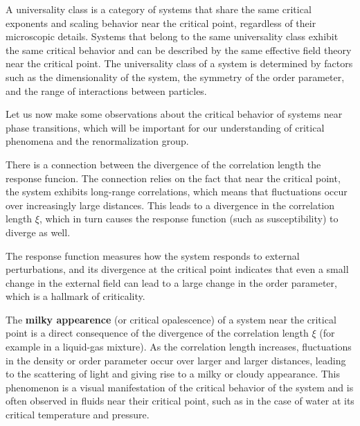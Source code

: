 \begin{definition}
    A universality class is a category of systems that share the same critical exponents and scaling behavior near the critical point, regardless of their microscopic details. Systems that belong to the same universality class exhibit the same critical behavior and can be described by the same effective field theory near the critical point. The universality class of a system is determined by factors such as the dimensionality of the system, the symmetry of the order parameter, and the range of interactions between particles.
\end{definition}

Let us now make some observations about the critical behavior of systems near phase transitions, which will be important for our understanding of critical phenomena and the renormalization group.

\begin{remark}
    There is a connection between the divergence of the correlation length the response funcion. 
    The connection relies on the fact that near the critical point, the system exhibits long-range correlations, which means that fluctuations occur over increasingly large distances. This leads to a divergence in the correlation length \(\xi\), which in turn causes the response function (such as susceptibility) to diverge as well.

    The response function measures how the system responds to external perturbations, and its divergence at the critical point indicates that even a small change in the external field can lead to a large change in the order parameter, which is a hallmark of criticality.
\end{remark}

\begin{remark}
    The \textbf{milky appearence} (or critical opalescence) of a system near the critical point is a direct consequence of the divergence of the correlation length \(\xi\) (for example in a liquid-gas mixture). As the correlation length increases, fluctuations in the density or order parameter occur over larger and larger distances, leading to the scattering of light and giving rise to a milky or cloudy appearance. This phenomenon is a visual manifestation of the critical behavior of the system and is often observed in fluids near their critical point, such as in the case of water at its critical temperature and pressure.
\end{remark}

